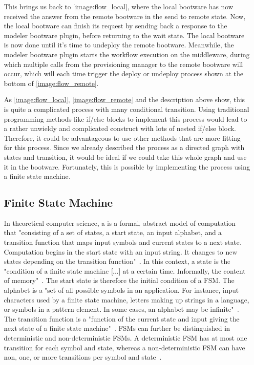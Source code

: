 This brings us back to \autoref{image:flow_local}, where the local bootware has now received the answer from the remote bootware in the send to remote state.
Now, the local bootware can finish its request by sending back a response to the modeler bootware plugin, before returning to the wait state.
The local bootware is now done until it's time to undeploy the remote bootware.
Meanwhile, the modeler bootware plugin starts the workflow execution on the middleware, during which multiple calls from the provisioning manager to the remote bootware will occur, which will each time trigger the deploy or undeploy process shown at the bottom of \autoref{image:flow_remote}.

As \autoref{image:flow_local}, \autoref{image:flow_remote} and the description above show, this is quite a complicated process with many conditional transition.
Using traditional programming methods like if/else blocks to implement this process would lead to a rather unwieldy and complicated construct with lots of nested if/else block.
Therefore, it could be advantageous to use other methods that are more fitting for this process.
Since we already described the process as a directed graph with states and transition, it would be ideal if we could take this whole graph and use it in the bootware.
Fortunately, this is possible by implementing the process using a finite state machine.

\subsection{Finite State Machine}

In theoretical computer science, a  is a formal, abstract model of computation that "consisting of a set of states, a start state, an input alphabet, and a transition function that maps input symbols and current states to a next state. Computation begins in the start state with an input string. It changes to new states depending on the transition function"~\autocite{fsm}.
In this context, a state is the "condition of a finite state machine [...] at a certain time. Informally, the content of memory"~\autocite{state}.
The start state is therefore the initial condition of a FSM.
The alphabet is a "set of all possible symbols in an application. For instance, input characters used by a finite state machine, letters making up strings in a language, or symbols in a pattern element. In some cases, an alphabet may be infinite"~\autocite{alphabet}.
The transition function is a "function of the current state and input giving the next state of a finite state machine"~\autocite{transitionfn}.
FSMs can further be distinguished in deterministic and non-deterministic FSMs.
A deterministic FSM has at most one transition for each symbol and state, whereas a non-deterministic FSM can have non, one, or more transitions per symbol and state~\autocite{deterministic}.

